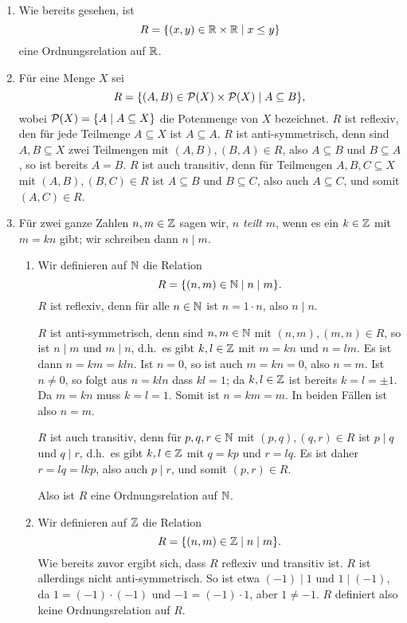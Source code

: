 \begin{bsp}
 \begin{enumerate}[leftmargin=*]

  \item
   Wie bereits gesehen, ist
   \[
    R = \{(x,y) \in \mathbb{R} \times \mathbb{R} \mid x \leq y\}
   \]
   eine Ordnungsrelation auf $\mathbb{R}$.
   
  \item
   Für eine Menge $X$ sei
   \[
    R = \{(A,B) \in \mathcal{P}(X) \times \mathcal{P}(X) \mid A \subseteq B\},
   \]
   wobei $\mathcal{P}(X) = \{A \mid A \subseteq X\}$ die Potenmenge von $X$ bezeichnet. $R$ ist reflexiv, den für jede Teilmenge $A \subseteq X$ ist $A \subseteq A$. $R$ ist anti-symmetrisch, denn sind $A, B \subseteq X$ zwei Teilmengen mit $(A,B), (B,A) \in R$, also $A \subseteq B$ und $B \subseteq A$, so ist bereits $A = B$. $R$ ist auch transitiv, denn für Teilmengen $A,B,C \subseteq X$ mit $(A,B), (B,C) \in R$ ist $A \subseteq B$ und $B \subseteq C$, also auch $A \subseteq C$, und somit $(A,C) \in R$.
   
  \item
   Für zwei ganze Zahlen $n,m \in \mathbb{Z}$ sagen wir, \emph{$n$ teilt $m$}, wenn es ein $k \in \mathbb{Z}$ mit $m = kn$ gibt; wir schreiben dann $n \mid m$.
   \begin{enumerate}[label=\alph*)]
    \item
     Wir definieren auf $\mathbb{N}$ die Relation
     \[
      R = \{(n,m) \in \mathbb{N} \mid n \mid m\}.
     \]
     $R$ ist reflexiv, denn für alle $n \in \mathbb{N}$ ist $n = 1 \cdot n$, also $n \mid n$.
     
     $R$ ist anti-symmetrisch, denn sind $n,m \in \mathbb{N}$ mit $(n,m), (m,n) \in R$, so ist $n \mid m$ und $m \mid n$, d.h.\ es gibt $k,l \in \mathbb{Z}$ mit $m = kn$ und $n = lm$. Es ist dann $n = km = kln$. Ist $n = 0$, so ist auch $m = kn = 0$, also $n = m$. Ist $n \neq 0$, so folgt aus $n = kln$ dass $kl = 1$; da $k,l \in \mathbb{Z}$ ist bereits $k = l = \pm 1$. Da $m = kn$ muss $k = l = 1$. Somit ist $n = k m = m$. In beiden Fällen ist also $n = m$.
     
     $R$ ist auch transitiv, denn für $p,q,r \in \mathbb{N}$ mit $(p,q), (q,r) \in R$ ist $p \mid q$ und $q \mid r$, d.h.\ es gibt $k,l \in \mathbb{Z}$ mit $q = kp$ und $r = lq$. Es ist daher $r = lq = lkp$, also auch $p \mid r$, und somit $(p,r) \in R$.
     
     Also ist $R$ eine Ordnungsrelation auf $\mathbb{N}$.
    \item
     Wir definieren auf $\mathbb{Z}$ die Relation
     \[
      R = \{(n,m) \in \mathbb{Z} \mid n \mid m\}.
     \]
     Wie bereits zuvor ergibt sich, dass $R$ reflexiv und transitiv ist. $R$ ist allerdings nicht anti-symmetrisch. So ist etwa $(-1) \mid 1$ und $1 \mid (-1)$, da $1 = (-1) \cdot (-1)$ und $-1 = (-1) \cdot 1$, aber $1 \neq -1$. $R$ definiert also keine Ordnungsrelation auf $R$.
   \end{enumerate}
 \end{enumerate}
\end{bsp}


